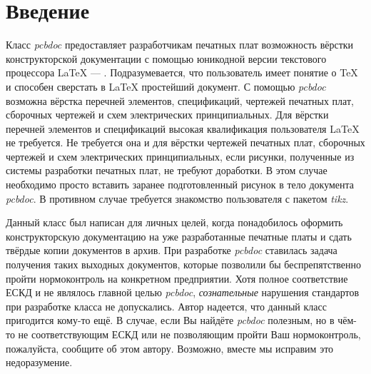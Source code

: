 
\section{Введение}

Класс \emph{pcbdoc} предоставляет разработчикам печатных плат возможность
вёрстки конструкторской документации с помощью юникодной версии текстового
процессора \LaTeX{} --- \XeLaTeX{}. Подразумевается, что пользователь
имеет понятие о \TeX{} и способен сверстать в \LaTeX{} простейший
документ. С помощью \emph{pcbdoc} возможна вёрстка перечней элементов,
спецификаций, чертежей печатных плат, сборочных чертежей и схем электрических
принципиальных. Для вёрстки перечней элементов и спецификаций высокая
квалификация пользователя \LaTeX{} не требуется. Не требуется она и для
вёрстки чертежей печатных плат, сборочных чертежей и схем электрических
принципиальных, если рисунки, полученные из системы разработки печатных плат, не
требуют доработки. В этом случае необходимо просто вставить заранее
подготовленный рисунок в тело документа \emph{pcbdoc}. В противном случае
требуется знакомство пользователя с пакетом \emph{tikz}.

Данный класс был написан для личных целей, когда понадобилось оформить
конструкторскую документацию на уже разработанные печатные платы и сдать твёрдые
копии документов в архив. При разработке \emph{pcbdoc} ставилась задача
получения таких выходных документов, которые позволили бы беспрепятственно
пройти нормоконтроль на конкретном предприятии. Хотя полное соответствие ЕСКД и
не являлось главной целью \emph{pcbdoc}, \emph{сознательные} нарушения
стандартов при разработке класса не допускались. Автор надеется, что данный
класс пригодится кому-то ещё. В случае, если Вы найдёте \emph{pcbdoc}
полезным, но в чём-то не соответствующим ЕСКД или не позволяющим пройти Ваш
нормоконтроль, пожалуйста, сообщите об этом автору. Возможно, вместе мы исправим
это недоразумение.

